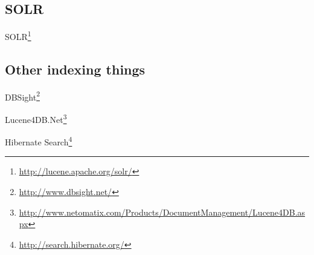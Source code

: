 
\subsection{SOLR}

SOLR\footnote{\url{http://lucene.apache.org/solr/}}

\subsection{Other indexing things}
\begin{mlist}
\item DBSight\footnote{
        \url{http://www.dbsight.net/}
        }

\item Lucene4DB.Net\footnote{
        \url{http://www.netomatix.com/Products/DocumentManagement/Lucene4DB.aspx}
        }

\item Hibernate Search\footnote{
        \url{http://search.hibernate.org/}
        }

\end{mlist}


